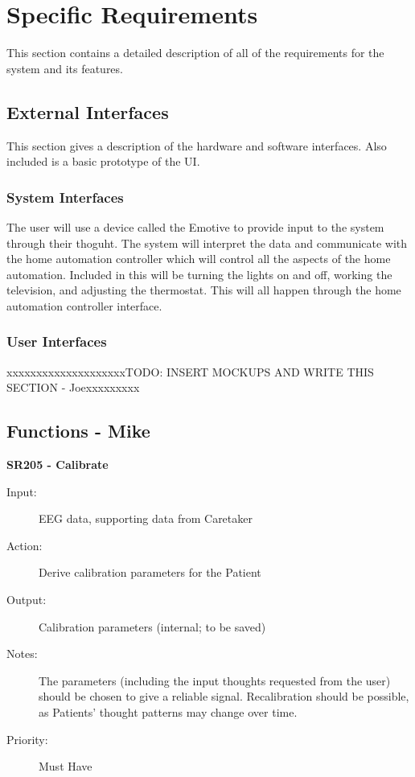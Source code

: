 \documentclass{article}
\begin{document}
\section{Specific Requirements}
This section contains a detailed description of all of the requirements for the system and its features. 

\subsection{External Interfaces}
This section gives a description of the hardware and software interfaces. Also included is a basic prototype of the UI.

\subsubsection{System Interfaces}

The user will use a device called the Emotive to provide input to the system through their thoguht. The system will interpret the data and communicate with the home automation controller which will control all the aspects of the home automation. Included in this will be turning the lights on and off, working the television, and adjusting the thermostat. This will all happen through the home automation controller interface.

\subsubsection{User Interfaces}
{\color{red}xxxxxxxxxxxxxxxxxxxxTODO: INSERT MOCKUPS AND WRITE THIS SECTION - Joexxxxxxxxx}

\subsection{Functions - Mike}


\textbf{SR205 - Calibrate}
\begin{description}
    \item[Input:] EEG data, supporting data from Caretaker
    \item[Action:] Derive calibration parameters for the Patient
    \item[Output:] Calibration parameters (internal; to be saved)
    \item[Notes:] The parameters (including the input thoughts requested from
        the user) should be chosen to give a reliable signal. Recalibration
        should be possible, as Patients' thought patterns may change over
        time.
    \item[Priority:] Must Have
\end{description}
\end{document}
